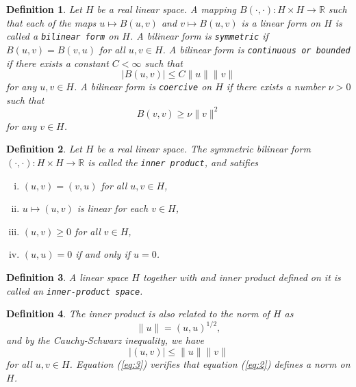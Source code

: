 \documentclass[11pt]{article}
\newtheorem{definition}{Definition}
\theoremstyle{definition}
\begin{document}
\begin{definition}
	Let $H$ be a real linear space. A mapping $B(\cdot , \cdot) : H \times H \rightarrow \mathbb{R}$ such that each of the maps
	$u \mapsto B(u,v)$ and $v \mapsto B(u,v)$ is a linear form on $H$ is called a \texttt{bilinear form} on $H$.
	A bilinear form is \texttt{symmetric} if $B(u,v) = B(v,u)$ for all $u,v \in H$.
	A bilinear form is \texttt{continuous or bounded} if there exists a constant $C < \infty$ such that
	\begin{equation*}
		|B(u,v)| \leq C\|u\|\|v\|
	\end{equation*}
	for any $u,v \in H$.
	A bilinear form is \texttt{coercive} on $H$ if there exists a number $\nu > 0$ such that
	\begin{equation*}
		B(v,v) \geq \nu\|v\|^2
	\end{equation*}
	for any $v \in H$.
\end{definition}

\begin{definition}
	Let $H$ be a real linear space.
	The symmetric bilinear form $(\cdot , \cdot) : H \times H \rightarrow \mathbb{R}$ is called the \texttt{inner product},
	and satifies
	\begin{enumerate}[(i)]
		\item $(u,v) = (v,u)$ for all $u,v \in H$,
		\item $u \mapsto (u,v)$ is linear for each $v \in H$,
		\item $(u,v) \geq 0$ for all $v \in H$,
		\item $(u,u) = 0$ if and only if $u = 0$.
	\end{enumerate}
\end{definition}

\begin{definition}
	A linear space $H$ together with and inner product defined on it is called an \texttt{inner-product space}.
\end{definition}

\begin{definition}
	The inner product is also related to the norm of $H$ as
	\begin{equation}
		\label{eq:2}
		\|u\| = (u,u)^{1/2},
	\end{equation}
	and by the Cauchy-Schwarz inequality, we have
	\begin{equation}
		\label{eq:3}
		|(u,v)| \leq \|u\|\|v\|
	\end{equation}
	for all $u,v \in H$. Equation (\ref{eq:3}) verifies that equation (\ref{eq:2}) defines a norm on $H$. 
\end{definition}
\end{document}
